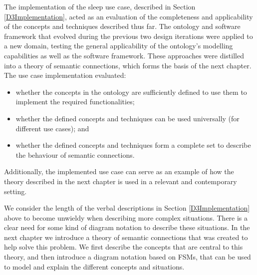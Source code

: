 The implementation of the sleep use case, described in Section \ref{D3Implementation}, acted as an evaluation of the completeness and applicability of the concepts and techniques described thus far. The ontology and software framework that evolved during the previous two design iterations were applied to a new domain, testing the general applicability of the ontology's modelling capabilities as well as the software framework. These approaches were distilled into a theory of semantic connections, which forms the basis of the next chapter. The use case implementation evaluated: 
\begin{itemize}
	\item whether the concepts in the ontology are sufficiently defined to use them to implement the required functionalities;
	\item whether the defined concepts and techniques can be used universally (for different use cases); and
	\item  whether the defined concepts and techniques form a complete set to describe the behaviour of semantic connections.
\end{itemize}

Additionally, the implemented use case can serve as an example of how the theory described in the next chapter is used in a relevant and contemporary setting.

We consider the length of the verbal descriptions in Section \ref{D3Implementation} above to become unwieldy when describing more complex situations. There is a clear need for some kind of diagram notation to describe these situations. In the next chapter we introduce a theory of semantic connections that was created to help solve this problem. We first describe the concepts that are central to this theory, and then introduce a diagram notation based on \acp{FSM}, that can be used to model and explain the different concepts and situations.


